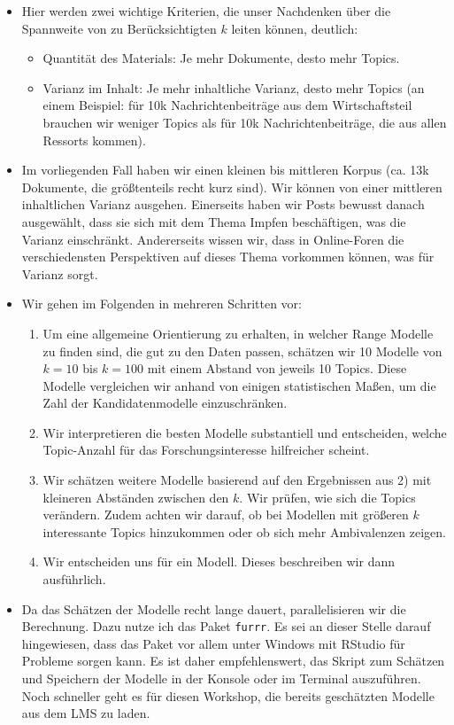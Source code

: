 \documentclass[
]{book}
\providecommand{\tightlist}{%
  \setlength{\itemsep}{0pt}\setlength{\parskip}{0pt}}
\begin{document}
\begin{itemize}
\tightlist
\item
  Hier werden zwei wichtige Kriterien, die unser Nachdenken über die Spannweite von zu Berücksichtigten \(k\) leiten können, deutlich:

  \begin{itemize}
  \tightlist
  \item
    Quantität des Materials: Je mehr Dokumente, desto mehr Topics.
  \item
    Varianz im Inhalt: Je mehr inhaltliche Varianz, desto mehr Topics (an einem Beispiel: für 10k Nachrichtenbeiträge aus dem Wirtschaftsteil brauchen wir weniger Topics als für 10k Nachrichtenbeiträge, die aus allen Ressorts kommen).
  \end{itemize}
\item
  Im vorliegenden Fall haben wir einen kleinen bis mittleren Korpus (ca. 13k Dokumente, die größtenteils recht kurz sind). Wir können von einer mittleren inhaltlichen Varianz ausgehen. Einerseits haben wir Posts bewusst danach ausgewählt, dass sie sich mit dem Thema Impfen beschäftigen, was die Varianz einschränkt. Andererseits wissen wir, dass in Online-Foren die verschiedensten Perspektiven auf dieses Thema vorkommen können, was für Varianz sorgt.
\item
  Wir gehen im Folgenden in mehreren Schritten vor:

  \begin{enumerate}
  \def\labelenumi{\arabic{enumi})}
  \tightlist
  \item
    Um eine allgemeine Orientierung zu erhalten, in welcher Range Modelle zu finden sind, die gut zu den Daten passen, schätzen wir 10 Modelle von \(k = 10\) bis \(k = 100\) mit einem Abstand von jeweils 10 Topics. Diese Modelle vergleichen wir anhand von einigen statistischen Maßen, um die Zahl der Kandidatenmodelle einzuschränken.
  \item
    Wir interpretieren die besten Modelle substantiell und entscheiden, welche Topic-Anzahl für das Forschungsinteresse hilfreicher scheint.
  \item
    Wir schätzen weitere Modelle basierend auf den Ergebnissen aus 2) mit kleineren Abständen zwischen den \(k\). Wir prüfen, wie sich die Topics verändern. Zudem achten wir darauf, ob bei Modellen mit größeren \(k\) interessante Topics hinzukommen oder ob sich mehr Ambivalenzen zeigen.
  \item
    Wir entscheiden uns für ein Modell. Dieses beschreiben wir dann ausführlich.
  \end{enumerate}
\item
  Da das Schätzen der Modelle recht lange dauert, parallelisieren wir die Berechnung. Dazu nutze ich das Paket \texttt{furrr}. Es sei an dieser Stelle darauf hingewiesen, dass das Paket vor allem unter Windows mit RStudio für Probleme sorgen kann. Es ist daher empfehlenswert, das Skript zum Schätzen und Speichern der Modelle in der Konsole oder im Terminal auszuführen. Noch schneller geht es für diesen Workshop, die bereits geschätzten Modelle aus dem LMS zu laden.
\end{itemize}
\end{document}
